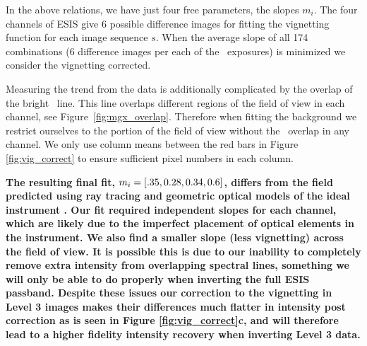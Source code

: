\documentclass[linenumbers,trackchanges]{aastex63}
\begin{document}
In the above relations, we have just four free parameters, the slopes $m_i$. 
The four channels of ESIS give 6 possible difference images for fitting the vignetting function for each image sequence $s$.
When the average slope of all 174 combinations (6 difference images per each of the \numDataFrames \ exposures) is minimized we consider the vignetting corrected.

Measuring the trend from the data is additionally complicated by the overlap of the bright \mgxbright \ line.  
This line overlaps different regions of the field of view in each channel, see Figure~\ref{fig:mgx_overlap}.  
Therefore when fitting the background we restrict ourselves to the portion of the field of view without the \mgxbright \ overlap in any channel.
We only use column means between the red bars in Figure \ref{fig:vig_correct} to ensure sufficient pixel numbers in each column.  


\textbf{The resulting final fit, $m_i = [.35, 0.28, 0.34, 0.6]$, differs from the field predicted using ray tracing and geometric optical models of the ideal instrument \citep{ESIS}.
Our fit required independent slopes for each channel, which are likely due to the imperfect placement of optical elements in the instrument.
We also find a smaller slope (less vignetting) across the field of view.
It is possible this is due to our inability to completely remove extra intensity from overlapping spectral lines, something we will only be able to do properly when inverting the full ESIS passband.
Despite these issues our correction to the vignetting in Level 3 images makes their differences much flatter in intensity post correction as is seen in Figure \ref{fig:vig_correct}c, and will therefore lead to a higher fidelity intensity recovery when inverting Level 3 data.}


  
        
\end{document}
